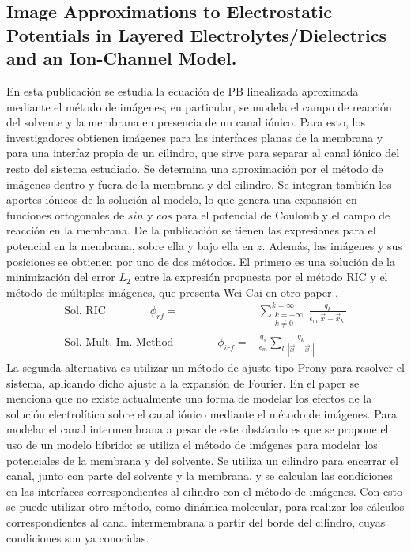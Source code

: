 \documentclass[12pt, notitlepage]{article}
\begin{document}
\subsection{Image Approximations to Electrostatic Potentials in Layered Electrolytes/Dielectrics and an Ion-Channel Model.\cite{Huimin-Lin}}
En esta publicación se estudia la ecuación de PB linealizada aproximada mediante el método de imágenes; en particular, se modela el campo de reacción del solvente y la membrana en presencia de un canal iónico. Para esto, los investigadores obtienen imágenes para las interfaces planas de la membrana y para una interfaz propia de un cilindro, que sirve para separar al canal iónico del resto del sistema estudiado. Se determina una aproximación por el método de imágenes dentro y fuera de la membrana y del cilindro. Se integran también los aportes iónicos de la solución al modelo, lo que genera una expansión en funciones ortogonales de $sin$ y $cos$ para el potencial de Coulomb y el campo de reacción en la membrana. De la publicación se tienen las expresiones para el potencial en la membrana, sobre ella y bajo ella en $z$. Además, las imágenes y sus posiciones se obtienen por uno de dos métodos. El primero es una solución de la minimización del error $L_2$ entre la expresión propuesta por el método RIC \cite{Pei-kun} y el método de múltiples imágenes, que presenta Wei Cai en otro paper \cite{Wei-Cai}.
\begin{align*}
\text{Sol. RIC}\qquad\qquad \phi_{rf} = &\sum_{\substack{k = -\infty\\
k \neq 0}}^{k = \infty} \frac{q_k}{\epsilon_m|\vec{x} - \vec{x}_k|}\\
\text{Sol. Mult. Im. Method}\qquad\qquad \phi_{irf} = & \frac{q_s}{\epsilon_m}\sum_{l}\frac{q_k}{|\vec{x} - \vec{x}_l|}
\end{align*}
La segunda alternativa es utilizar un método de ajuste tipo Prony para resolver el sistema, aplicando dicho ajuste a la expansión de Fourier. En el paper se menciona que no existe actualmente una forma de modelar los efectos de la solución electrolítica sobre el canal iónico mediante el método de imágenes. Para modelar el canal intermembrana a pesar de este obstáculo es que se propone el uso de un modelo híbrido: se utiliza el método de imágenes para modelar los potenciales de la membrana y del solvente. Se utiliza un cilindro para encerrar el canal, junto con parte del solvente y la membrana, y se calculan las condiciones en las interfaces correspondientes al cilindro con el método de imágenes. Con esto se puede utilizar otro método, como dinámica molecular, para realizar los cálculos correspondientes al canal intermembrana a partir del borde del cilindro, cuyas condiciones son ya conocidas.
\end{document}
